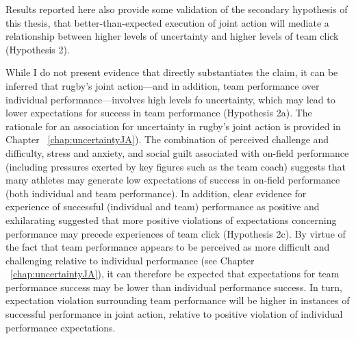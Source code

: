 \begin{CJK}{UTF8}{gbsn}
Results reported here also provide some validation of the secondary hypothesis of this thesis, that better-than-expected execution of joint action will mediate a relationship between higher levels of uncertainty and higher levels of team click (Hypothesis 2).


While I do not present evidence that directly substantiates the claim, it can be inferred that rugby's joint action---and in addition, team performance over individual performance---involves high levels fo uncertainty, which may lead to lower expectations for success in team performance (Hypothesis 2a).  The rationale for an association for uncertainty in rugby's joint action is provided in Chapter ~\ref{chap:uncertaintyJA}).  The combination of perceived challenge and difficulty, stress and anxiety, and social guilt associated with on-field performance (including pressures exerted by key figures such as the team coach) suggests that many athletes may generate low expectations of success in on-field performance (both individual and team performance).   In addition, clear evidence for experience of successful (individual and team) performance as positive and exhilarating suggested that more positive violations of expectations concerning performance may precede experiences of team click (Hypothesis 2c).  By virtue of the fact that team performance appears to be perceived as more difficult and challenging relative to individual performance (see Chapter ~\ref{chap:uncertaintyJA}), it can therefore be expected that expectations for team performance success may be lower than individual performance success. In turn, expectation violation surrounding team performance will be higher in instances of successful performance in joint action, relative to positive violation of individual performance expectations.


\end{CJK}
